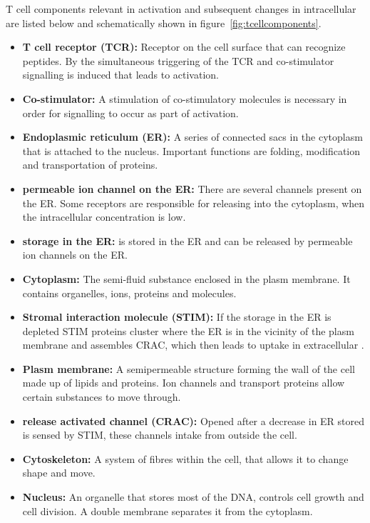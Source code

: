 T cell components relevant in activation and subsequent changes in intracellular \Calcium are listed below and schematically shown in figure~\ref{fig:tcellcomponents}.

\begin{itemize}
	\item \textbf{T cell receptor (TCR):} Receptor on the cell surface that can recognize peptides. By the simultaneous triggering of the TCR and co-stimulator signalling is induced that leads to activation.
	\item \textbf{Co-stimulator:} A stimulation of co-stimulatory molecules is necessary in order for signalling to occur as part of activation.
	\item \textbf{Endoplasmic reticulum (ER):} A series of connected sacs in the cytoplasm that is attached to the nucleus. Important functions are folding, modification and transportation of proteins.\cite{Rogers2024}
	\item \textbf{\Calcium permeable ion channel on the ER:} There are several \Calcium channels present on the ER. Some receptors are responsible for releasing \Calcium into the cytoplasm, when the intracellular \Calcium concentration is low. \cite{Schwarz2016}
	\item \textbf{\Calcium storage in the ER:} \Calcium is stored in the ER and can be released by \Calcium permeable ion channels on the ER.
	\item \textbf{Cytoplasm:} The semi-fluid substance enclosed in the plasm membrane. It contains organelles, ions, proteins and molecules.
	\item \textbf{Stromal interaction molecule (STIM):} If the \Calcium storage in the ER is depleted STIM proteins cluster where the ER is in the vicinity of the plasm membrane and assembles CRAC, which then leads to uptake in extracellular \Calcium. \cite{Schwarz2016}
	\item \textbf{Plasm membrane:} A semipermeable structure forming the wall of the cell made up of lipids and proteins. Ion channels and transport proteins allow certain substances to move through.\cite{Ganong2012}
	\item \textbf{\Calcium release activated \Calcium channel (CRAC):} Opened after a decrease in ER stored \Calcium is sensed by STIM, these channels intake \Calcium from outside the cell.\cite{Stathopulos2013}
	\item \textbf{Cytoskeleton:} A system of fibres within the cell, that allows it to change shape and move.\cite{Ganong2012}
	\item \textbf{Nucleus:} An organelle that stores most of the DNA, controls cell growth and cell division. A double membrane separates it from the cytoplasm.\cite{cooper2022}
\end{itemize}

